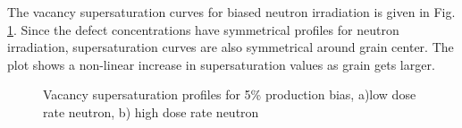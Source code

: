 \documentclass[a4paper]{article}
\begin{document}
    The vacancy supersaturation curves for biased neutron irradiation is given in Fig. \ref{figure:vacancy_supersaturation_neutron_5}. Since the defect concentrations have symmetrical profiles for neutron irradiation, supersaturation curves are also symmetrical around grain center. The plot shows a non-linear increase in supersaturation values as grain gets larger.
      \begin{figure}[h!]  %
        \centering
        \qquad
        \caption{Vacancy supersaturation profiles for 5\% production bias, a)low dose rate neutron, b) high dose rate neutron}
        \label{figure:vacancy_supersaturation_neutron_5}
      \end{figure}
\end{document}
